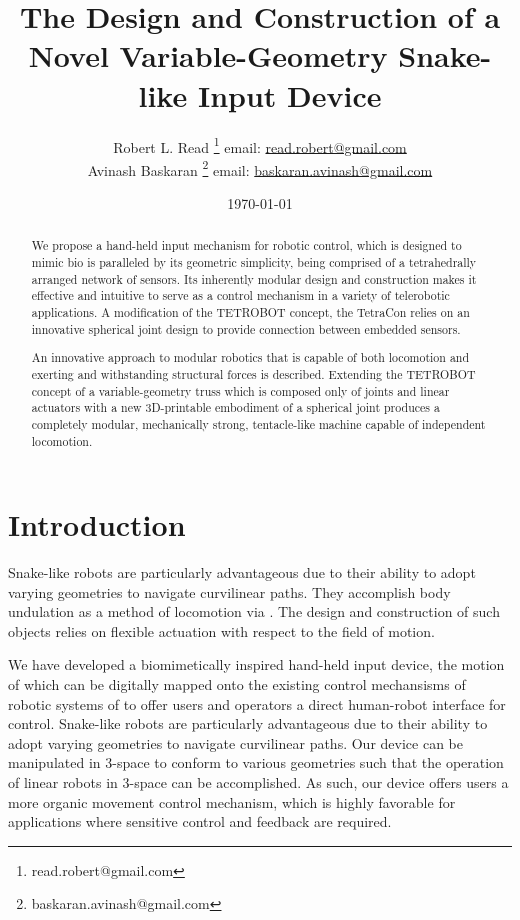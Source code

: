\documentclass[11pt]{article}
\title{The Design and Construction of a Novel Variable-Geometry Snake-like Input Device}
\author{Robert L. Read
  \thanks{read.robert@gmail.com}
  email: \href{mailto:read.robert@gmail.com}{read.robert@gmail.com}\\
Avinash Baskaran
  \thanks{baskaran.avinash@gmail.com}
  email: \href{mailto:Baskaran.avinash@gmail.com}{baskaran.avinash@gmail.com}
  }
\affil{Public Invention, an educational non-profit.}
\date{\today}
\begin{document}
\maketitle


\begin{abstract}

  We propose a hand-held input mechanism for robotic control, which is designed to mimic bio is paralleled by its geometric simplicity, being comprised of a tetrahedrally arranged network of sensors. Its inherently modular design and construction makes it effective and intuitive to serve as a control mechanism in a variety of telerobotic applications. A modification of the TETROBOT\cite{sanderson1996modular,lee2002dynamic,lee1999dynamics,TetrobotBook} concept, the TetraCon relies on an innovative spherical joint design\cite{song2003spherical} to provide connection between embedded sensors.


  An innovative approach to modular robotics that is capable of both locomotion and exerting and
  withstanding structural forces is described.
  Extending the TETROBOT\cite{sanderson1996modular,lee2002dynamic,lee1999dynamics,TetrobotBook}
  concept of a variable-geometry
  truss which is composed only of joints and linear actuators
  with a new 3D-printable embodiment of a
  spherical joint\cite{song2003spherical}
  produces a completely modular, mechanically strong, tentacle-like machine capable of independent locomotion.
\end{abstract}


\section{Introduction}

Snake-like robots are particularly advantageous due to their ability to adopt varying geometries to navigate curvilinear paths.  They accomplish body undulation as a method of locomotion via . The design and construction of such objects relies on flexible actuation with respect to the field of motion.

  We have developed a biomimetically inspired hand-held input device, the motion of which can be digitally mapped onto the existing control mechansisms of robotic systems of to offer users and operators a direct human-robot interface for control. Snake-like robots are particularly advantageous due to their ability to adopt varying geometries to navigate curvilinear paths. Our device can be manipulated in 3-space to conform to various geometries such that the operation of linear robots in 3-space can be accomplished. As such, our device offers users a more organic movement control mechanism, which is highly favorable for applications where sensitive control and feedback are required. 
\end{document}
